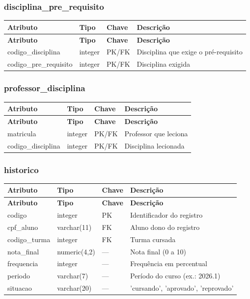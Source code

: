 \documentclass[12pt,a4paper]{article}
\begin{document}
\subsubsection{disciplina\_pre\_requisito}

\begin{longtable}{@{}llll@{}}
\toprule
\textbf{Atributo} & \textbf{Tipo} & \textbf{Chave} & \textbf{Descrição} \\
\midrule
\endfirsthead
\toprule
\textbf{Atributo} & \textbf{Tipo} & \textbf{Chave} & \textbf{Descrição} \\
\midrule
\endhead
codigo\_disciplina & integer & PK/FK & Disciplina que exige o pré-requisito \\
codigo\_pre\_requisito & integer & PK/FK & Disciplina exigida \\
\bottomrule
\end{longtable}

\subsubsection{professor\_disciplina}

\begin{longtable}{@{}llll@{}}
\toprule
\textbf{Atributo} & \textbf{Tipo} & \textbf{Chave} & \textbf{Descrição} \\
\midrule
\endfirsthead
\toprule
\textbf{Atributo} & \textbf{Tipo} & \textbf{Chave} & \textbf{Descrição} \\
\midrule
\endhead
matricula & integer & PK/FK & Professor que leciona \\
codigo\_disciplina & integer & PK/FK & Disciplina lecionada \\
\bottomrule
\end{longtable}

\subsubsection{historico}

\begin{longtable}{@{}llll@{}}
\toprule
\textbf{Atributo} & \textbf{Tipo} & \textbf{Chave} & \textbf{Descrição} \\
\midrule
\endfirsthead
\toprule
\textbf{Atributo} & \textbf{Tipo} & \textbf{Chave} & \textbf{Descrição} \\
\midrule
\endhead
codigo & integer & PK & Identificador do registro \\
cpf\_aluno & varchar(11) & FK & Aluno dono do registro \\
codigo\_turma & integer & FK & Turma cursada \\
nota\_final & numeric(4,2) & --- & Nota final (0 a 10) \\
frequencia & integer & --- & Frequência em percentual \\
periodo & varchar(7) & --- & Período do curso (ex.: 2026.1) \\
situacao & varchar(20) & --- & 'cursando', 'aprovado', 'reprovado' \\
\bottomrule
\end{longtable}
\end{document}
